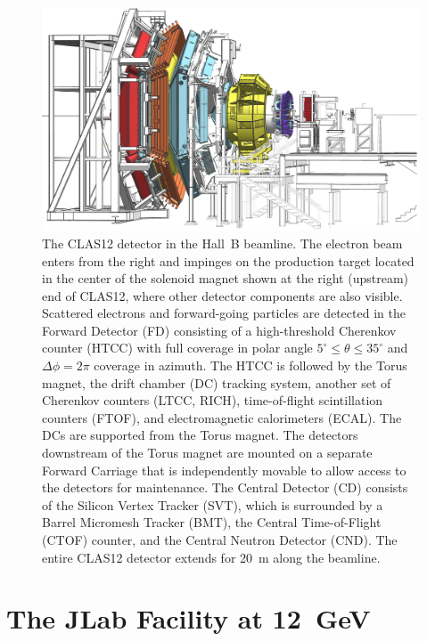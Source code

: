 \documentclass[final,3p,twocolumn]{elsarticle}
\begin{document}
\begin{figure}[t]
\centering
\centerline{\includegraphics[width=1.8\columnwidth]{CLAS12-side-3.png}}
\caption{The CLAS12 detector in the Hall~B beamline. The electron beam enters from the right and impinges on
the production target located in the center of the solenoid magnet shown at the right (upstream) end of CLAS12,
where other detector components are also visible. Scattered electrons and forward-going particles are detected
in the Forward Detector (FD) consisting of a high-threshold Cherenkov counter (HTCC) with full coverage in polar
angle $5^\circ \le \theta \le 35^\circ$ and $\Delta \phi = 2\pi$ coverage in azimuth. The HTCC is followed by the
Torus magnet, the drift chamber (DC) tracking system, another set of Cherenkov counters (LTCC, RICH),
time-of-flight scintillation counters (FTOF), and electromagnetic calorimeters (ECAL). The DCs are supported from
the Torus magnet. The detectors downstream of the Torus magnet are mounted on a separate Forward Carriage that
is independently movable to allow access to the detectors for maintenance. The Central Detector (CD) consists of the
Silicon Vertex Tracker (SVT), which is surrounded by a Barrel Micromesh Tracker (BMT), the Central Time-of-Flight
(CTOF) counter, and the Central Neutron Detector (CND). The entire CLAS12 detector extends for 20~m along the
beamline.} 
\label{clas12}
\end{figure}

\section{The JLab Facility at 12~GeV}
\label{jlab}
\end{document}
